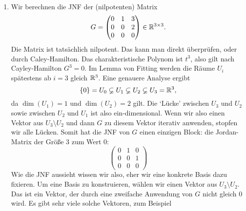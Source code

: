 \begin{bspe}\
	\begin{enumerate}
		\item
			Wir berechnen die JNF der (nilpotenten) Matrix
			\begin{equation*}
				G = \begin{pmatrix}
					0 & 1 & 3 \\
					0 & 0 & 2 \\
					0 & 0 & 0
				\end{pmatrix} \in \mathbb R^{3 \times 3}.
			\end{equation*}
			Die Matrix ist tatsächlich nilpotent. Das kann man direkt überprüfen, oder durch Caley-Hamilton. Das charakteristische Polynom ist $t^3$, also gilt nach Cayley-Hamilton $ G^3 = 0 $. Im Lemma von Fitting werden die Räume $U_i$ spätestens ab $i=3$ gleich $\mathbb R^3$. Eine genauere Analyse ergibt
			\begin{equation*}
				\left\{ 0 \right\} = U_0 \varsubsetneq U_1 \varsubsetneq U_2 \varsubsetneq U_3 = \mathbb R^3,
			\end{equation*}
			da $ \dim(U_1) = 1 $ und $ \dim(U_2) = 2 $ gilt. Die `Lücke' zwischen $U_3$ und $U_2$ sowie zwischen $U_2$ und $U_1$ ist also ein-dimensional. Wenn wir also einen Vektor aus $U_3 \setminus U_2$ und dann $G$ zu diesem Vektor iterativ anwenden, stopfen wir alle Lücken. Somit hat die JNF von $G$ einen einzigen Block: die Jordan-Matrix der Größe $3$ zum Wert $0$:
			\begin{equation*}
				\begin{pmatrix}
					0 & 1 & 0 \\
					0 & 0 & 1 \\
					0 & 0 & 0
				\end{pmatrix}
			\end{equation*}
			Wie die JNF aussieht wissen wir also, eher wir eine konkrete Basis dazu fixieren. 
			Um eine Basis zu konstruieren, wählen wir einen Vektor aus $ U_3 \setminus U_2 $. Das ist ein Vektor, der durch eine zweifache Anwendung von $G$ nicht gleich $0$ wird. Es gibt sehr viele solche Vektoren, zum Beispiel 
			

\end{enumerate}
\end{bspe}
